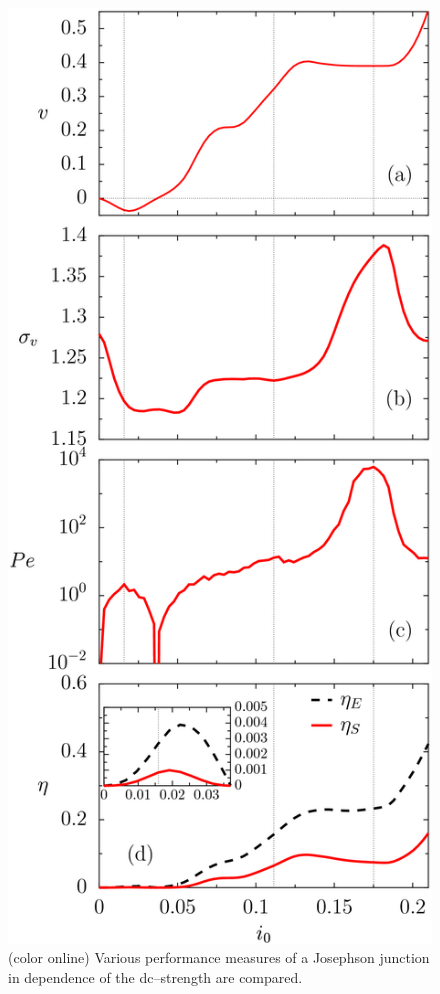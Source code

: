 \documentclass[a4,twocolumn,showpacs,showkeys]{revtex4}
\begin{document}
\begin{figure}
\includegraphics[scale=0.6]{fig1} 
\caption{(color online) Various performance measures of a
  Josephson  junction in dependence of the dc--strength are compared.
}
\end{figure}
\end{document}
